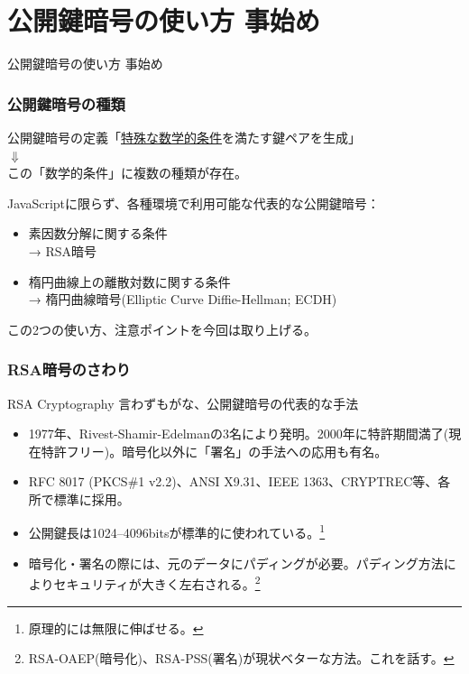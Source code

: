 \documentclass[12pt,dvipdfmx]{beamer}
\begin{document}
\section{公開鍵暗号の使い方 事始め}
\begin{frame}
\centering
{\Large 公開鍵暗号の使い方 事始め}
\end{frame}

\begin{frame}
\frametitle{公開鍵暗号の種類}
\begin{exampleblock}{}
\begin{center}
公開鍵暗号の定義「\underline{特殊な数学的条件}を満たす鍵ペアを生成」\\[0.5ex]
 $\Downarrow$\\[0.5ex]
この「数学的条件」に複数の種類が存在。
\end{center}
\end{exampleblock}

\vspace{2ex}

JavaScriptに限らず、各種環境で利用可能な代表的な公開鍵暗号：
\begin{itemize}
 \item 素因数分解に関する条件\\ → \alert{RSA暗号}
 \item 楕円曲線上の離散対数に関する条件\\ → \alert{楕円曲線暗号(Elliptic Curve Diffie-Hellman; ECDH)}
\end{itemize}
この2つの使い方、注意ポイントを今回は取り上げる。
\end{frame}

\begin{frame}
\frametitle{RSA暗号のさわり}
\begin{block}{RSA Cryptography}
言わずもがな、公開鍵暗号の代表的な手法
\begin{itemize}
 \item 1977年、Rivest-Shamir-Edelmanの3名により発明。2000年に特許期間満了(現在特許フリー)。暗号化以外に「署名」の手法への応用も有名。
 \item RFC 8017 (PKCS\#1 v2.2)、ANSI X9.31、IEEE 1363、CRYPTREC等、各所で標準に採用。
 \item 公開鍵長は1024--4096bitsが標準的に使われている。\footnote[frame]{原理的には無限に伸ばせる。}
 \item 暗号化・署名の際には、元のデータにパディングが必要。\alert{パディング方法によりセキュリティが大きく左右される。}\footnote[frame]{RSA-OAEP(暗号化)、RSA-PSS(署名)が現状ベターな方法。これを話す。}
\end{itemize}
\end{block}

\end{frame}
\end{document}
